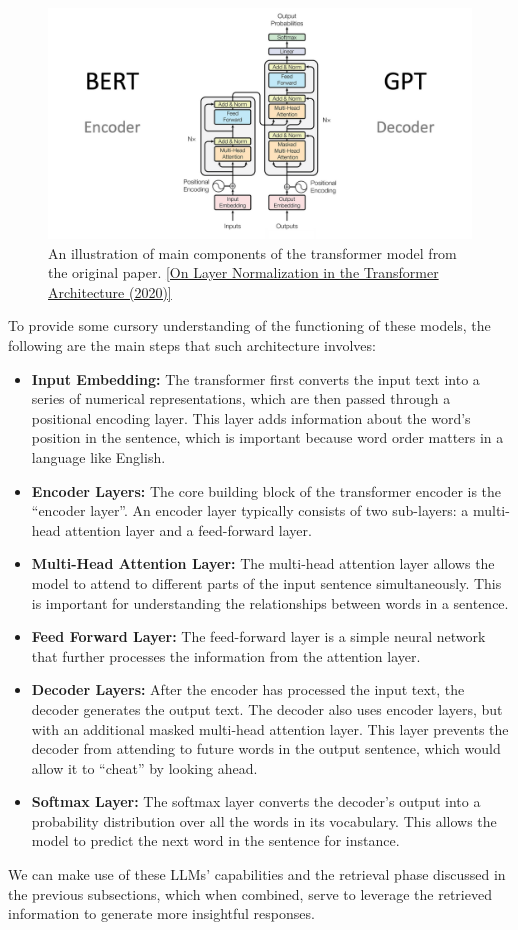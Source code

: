 \begin{figure}[H]
    \centering
    \includegraphics[width=\linewidth]{./figures/The-Transformer-model-architecture.png}
    \caption{An illustration of main components of the transformer model from the original paper. \href{https://arxiv.org/abs/2002.04745}{[On Layer Normalization in the Transformer Architecture (2020)]}}
\end{figure}
To provide some cursory understanding of the functioning of these models, the following are the main steps that such architecture involves:
\begin{itemize}
    \item \textbf{Input Embedding:} The transformer first converts the input text into a series of numerical representations,  which are then passed through a positional encoding layer. This layer adds information about the word’s position in the sentence, which is important because word order matters in a language like English.
    \item \textbf{Encoder Layers:} The core building block of the transformer encoder is the “encoder layer”.  An encoder layer typically consists of two sub-layers: a multi-head attention layer and a feed-forward layer.
    \item \textbf{Multi-Head Attention Layer:} The multi-head attention layer allows the model to attend to different parts of the input sentence simultaneously. This is important for understanding the relationships between words in a sentence.
    \item \textbf{Feed Forward Layer:} The feed-forward layer is a simple neural network that further processes the information from the attention layer.
    \item \textbf{Decoder Layers:} After the encoder has processed the input text, the decoder generates the output text. The decoder also uses encoder layers, but with an additional masked multi-head attention layer. This layer prevents the decoder from attending to future words in the output sentence, which would allow it to “cheat” by looking ahead.
    \item \textbf{Softmax Layer:} The softmax layer converts the decoder's output into a probability distribution over all the words in its vocabulary. This allows the model to predict the next word in the sentence for instance.
\end{itemize}
We can make use of these LLMs' capabilities and the retrieval phase discussed in the previous subsections, which when combined, serve to leverage the retrieved information to generate more insightful responses.
